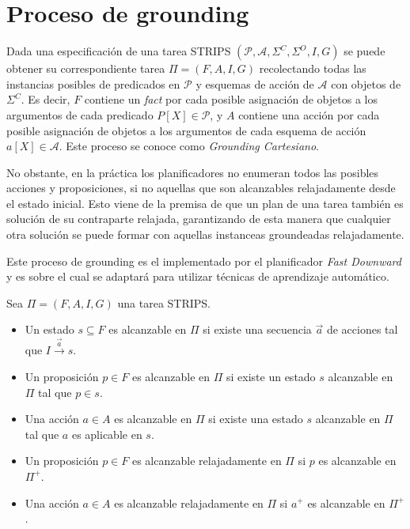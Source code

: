\section{Proceso de grounding}

Dada una especificación de una tarea STRIPS $(\mathcal{P}, \mathcal{A},
\Sigma^{C}, \Sigma^{O}, I, G)$ se puede obtener su correspondiente tarea $\Pi =
(F, A, I, G)$ recolectando todas las instancias posibles de predicados en
$\mathcal{P}$ y esquemas de acción de $\mathcal{A}$ con objetos de $\Sigma^{C}$.
Es decir, $F$ contiene un \emph{fact} por cada posible asignación de objetos a
los argumentos de cada predicado $P[X] \in \mathcal{P}$, y $A$ contiene una
acción por cada posible asignación de objetos a los argumentos de cada esquema
de acción $a[X] \in \mathcal{A}$. Este proceso se conoce como \emph{Grounding
Cartesiano}.

No obstante, en la práctica los planificadores no enumeran todos las posibles
acciones y proposiciones, si no aquellas que son alcanzables relajadamente desde
el estado inicial. Esto viene de la premisa de que un plan de una tarea también
es solución de su contraparte relajada, garantizando de esta manera que
cualquier otra solución se puede formar con aquellas instanceas groundeadas
relajadamente.

Este proceso de grounding es el implementado por el planificador \emph{Fast
Downward} \citep{Helmert-2011} y es sobre el cual se adaptará para utilizar
técnicas de aprendizaje automático.

\begin{mydef}
    Sea $\Pi = (F, A, I, G)$ una tarea STRIPS.    
    \begin{itemize}
        \item Un estado $s \subseteq F$ es alcanzable en $\Pi$ si existe una
        secuencia $\vec{a}$ de acciones tal que $I \xrightarrow{\vec{a}} s$.
    
        \item Un proposición $p \in F$ es alcanzable en $\Pi$ si existe un estado
        $s$ alcanzable en $\Pi$ tal que $p \in s$.

        \item Una acción $a \in A$ es alcanzable en $\Pi$ si existe una estado $s$
        alcanzable en $\Pi$ tal que $a$ es aplicable en $s$.

        \item Un proposición $p \in F$ es alcanzable relajadamente en $\Pi$ si
        $p$ es alcanzable en $\Pi^{+}$.

        \item Una acción $a \in A$ es alcanzable relajadamente en $\Pi$ si
        $a^{+}$ es alcanzable en $\Pi^{+}$.
    \end{itemize}
\end{mydef}



